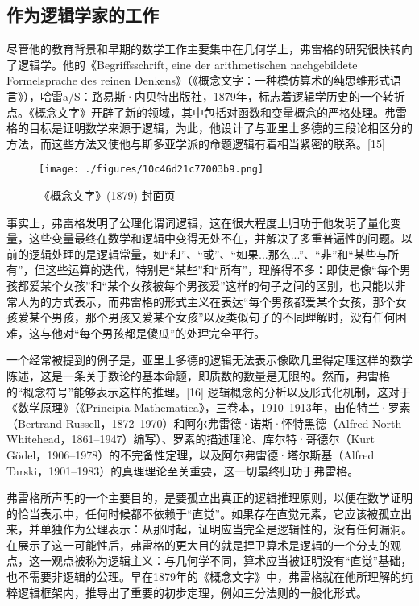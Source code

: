 \subsection{作为逻辑学家的工作}  
尽管他的教育背景和早期的数学工作主要集中在几何学上，弗雷格的研究很快转向了逻辑学。他的《Begriffsschrift, eine der arithmetischen nachgebildete Formelsprache des reinen Denkens》（《概念文字：一种模仿算术的纯思维形式语言》），哈雷a/S：路易斯·内贝特出版社，1879年，标志着逻辑学历史的一个转折点。《概念文字》开辟了新的领域，其中包括对函数和变量概念的严格处理。弗雷格的目标是证明数学来源于逻辑，为此，他设计了与亚里士多德的三段论相区分的方法，而这些方法又使他与斯多亚学派的命题逻辑有着相当紧密的联系。[15]
\begin{figure}[ht]
\centering
\texttt{[image: ./figures/10c46d21c77003b9.png]}
\caption{《概念文字》(1879) 封面页} \label{fig_Gottlo_2}
\end{figure}
事实上，弗雷格发明了公理化谓词逻辑，这在很大程度上归功于他发明了量化变量，这些变量最终在数学和逻辑中变得无处不在，并解决了多重普遍性的问题。以前的逻辑处理的是逻辑常量，如“和”、“或”、“如果...那么...”、“非”和“某些与所有”，但这些运算的迭代，特别是“某些”和“所有”，理解得不多：即使是像“每个男孩都爱某个女孩”和“某个女孩被每个男孩爱”这样的句子之间的区别，也只能以非常人为的方式表示，而弗雷格的形式主义在表达“每个男孩都爱某个女孩，那个女孩爱某个男孩，那个男孩又爱某个女孩”以及类似句子的不同理解时，没有任何困难，这与他对“每个男孩都是傻瓜”的处理完全平行。

一个经常被提到的例子是，亚里士多德的逻辑无法表示像欧几里得定理这样的数学陈述，这是一条关于数论的基本命题，即质数的数量是无限的。然而，弗雷格的“概念符号”能够表示这样的推理。[16] 逻辑概念的分析以及形式化机制，这对于《数学原理》（《Principia Mathematica》，三卷本，1910–1913年，由伯特兰·罗素（Bertrand Russell，1872–1970）和阿尔弗雷德·诺斯·怀特黑德（Alfred North Whitehead，1861–1947）编写）、罗素的描述理论、库尔特·哥德尔（Kurt Gödel，1906–1978）的不完备性定理，以及阿尔弗雷德·塔尔斯基（Alfred Tarski，1901–1983）的真理理论至关重要，这一切最终归功于弗雷格。

弗雷格所声明的一个主要目的，是要孤立出真正的逻辑推理原则，以便在数学证明的恰当表示中，任何时候都不依赖于“直觉”。如果存在直觉元素，它应该被孤立出来，并单独作为公理表示：从那时起，证明应当完全是逻辑性的，没有任何漏洞。在展示了这一可能性后，弗雷格的更大目的就是捍卫算术是逻辑的一个分支的观点，这一观点被称为逻辑主义：与几何学不同，算术应当被证明没有“直觉”基础，也不需要非逻辑的公理。早在1879年的《概念文字》中，弗雷格就在他所理解的纯粹逻辑框架内，推导出了重要的初步定理，例如三分法则的一般化形式。

